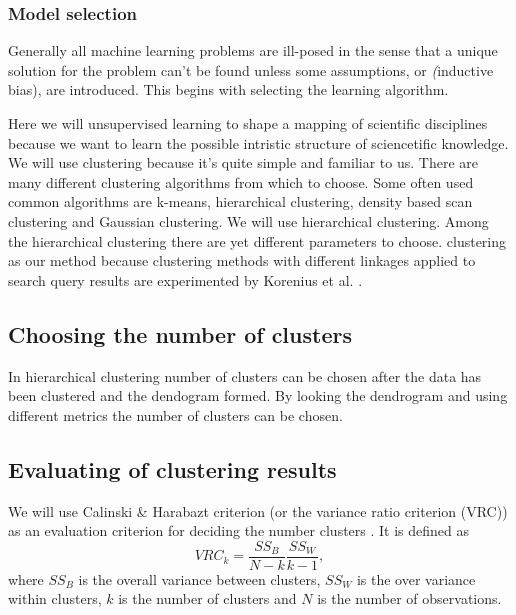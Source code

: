 \subsubsection{Model selection}
Generally all machine learning problems are ill-posed in the sense 
that a unique solution for the problem can't be found unless some
assumptions, or \emph(inductive bias), are introduced. This begins 
with selecting the learning algorithm.

Here we will unsupervised learning to shape a mapping of 
scientific disciplines because we want to learn the possible 
intristic structure of sciencetific knowledge. We will use 
clustering because it's quite simple and familiar to us. 
There are many different clustering algorithms from which to 
choose. Some often used common algorithms are k-means, hierarchical
clustering, density based scan clustering and Gaussian clustering.
We will use hierarchical clustering. Among the hierarchical 
clustering there are yet different parameters to choose. 
clustering as our method because clustering methods with different linkages applied 
to search query results are experimented by Korenius et al. 
\cite{korenius_hierarchical_2006}.



\subsection{Choosing the number of clusters}

In hierarchical clustering number of clusters can be chosen after 
the data has been clustered and the dendogram 
 formed.
 By 
looking the dendrogram and using different metrics the number of 
clusters can be chosen.


\subsection{Evaluating of clustering results}
We will use Calinski \& Harabazt criterion (or the variance ratio 
criterion (VRC)) as an evaluation criterion for 
deciding the number clusters \cite{calinski_dendrite_1974}. It 
is defined as
\begin{equation}
 VRC_k = \frac{SS_B}{N-k} \frac{SS_W}{k-1},
\end{equation}
where $SS_B$ is the overall variance between clusters, $SS_W$ is 
the over variance within clusters, $k$ is the number of clusters 
and $N$ is the number of observations.

